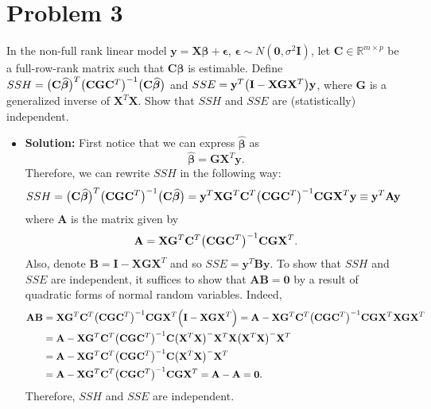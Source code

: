 \documentclass[11pt]{article}
\newcommand{\R}{{\mathbb R}}
\begin{document}
\section*{Problem 3}
In the non-full rank linear model $\mathbf{y} = \mathbf{X}\bm\beta + \bm\epsilon$, $\bm\epsilon\sim N(\mathbf{0},\sigma^2\mathbf{I})$, let $\mathbf{C}\in\R^{m\times p}$ be a full-row-rank matrix such that $\mathbf{C}\bm\beta$ is estimable.  Define $SSH = \big{(}\mathbf{C}\widehat{\bm\beta}\big{)}^T\big{(}\mathbf{C}\mathbf{G}\mathbf{C}^T\big{)}^{-1}\big{(}\mathbf{C}\widehat{\bm\beta}\big{)}$ and $SSE = \mathbf{y}^T\big{(}\mathbf{I} - \mathbf{X}\mathbf{G}\mathbf{X}^T\big{)}\mathbf{y}$, where $\mathbf{G}$ is a generalized inverse of $\mathbf{X}^T\mathbf{X}$.  Show that $SSH$ and $SSE$ are (statistically) independent.
\begin{itemize}
\item[] \textbf{Solution:} First notice that we can express $\widehat{\bm\beta}$ as
\[
\widehat{\bm\beta} = \mathbf{G}\mathbf{X}^T\mathbf{y}.
\]
Therefore, we can rewrite $SSH$ in the following way:
\begin{align*}
SSH &= \big{(}\mathbf{C}\widehat{\bm\beta}\big{)}^T\big{(}\mathbf{C}\mathbf{G}\mathbf{C}^T\big{)}^{-1}\big{(}\mathbf{C}\widehat{\bm\beta}\big{)} = \mathbf{y}^T\mathbf{X}\mathbf{G}^T\mathbf{C}^T\big{(}\mathbf{C}\mathbf{G}\mathbf{C}^T\big{)}^{-1} \mathbf{C}\mathbf{G}\mathbf{X}^T\mathbf{y} \equiv \mathbf{y}^T\mathbf{A}\mathbf{y}
\end{align*}
where $\mathbf{A}$ is the matrix given by
\[
\mathbf{A} = \mathbf{X}\mathbf{G}^T\mathbf{C}^T\big{(}\mathbf{C}\mathbf{G}\mathbf{C}^T\big{)}^{-1} \mathbf{C}\mathbf{G}\mathbf{X}^T.
\]
Also, denote $\mathbf{B} = \mathbf{I} - \mathbf{X}\mathbf{G}\mathbf{X}^T$ and so $SSE = \mathbf{y}^T\mathbf{B}\mathbf{y}$.  To show that $SSH$ and $SSE$ are independent, it suffices to show that $\mathbf{A}\mathbf{B} = \mathbf{0}$ by a result of quadratic forms of normal random variables.  Indeed,
\begin{align*}
\mathbf{A}\mathbf{B} &= \mathbf{X}\mathbf{G}^T\mathbf{C}^T\big{(}\mathbf{C}\mathbf{G}\mathbf{C}^T\big{)}^{-1} \mathbf{C}\mathbf{G}\mathbf{X}^T \Big{(}\mathbf{I} - \mathbf{X}\mathbf{G}\mathbf{X}^T\Big{)} = \mathbf{A} - \mathbf{X}\mathbf{G}^T\mathbf{C}^T\big{(}\mathbf{C}\mathbf{G}\mathbf{C}^T\big{)}^{-1} \mathbf{C}\mathbf{G}\mathbf{X}^T\mathbf{X}\mathbf{G}\mathbf{X}^T \\
&= \mathbf{A} - \mathbf{X}\mathbf{G}^T\mathbf{C}^T\big{(}\mathbf{C}\mathbf{G}\mathbf{C}^T\big{)}^{-1} \mathbf{C}\big{(}\mathbf{X}^T\mathbf{X}\big{)}^{-} \mathbf{X}^T\mathbf{X}\big{(}\mathbf{X}^T\mathbf{X}\big{)}^{-}\mathbf{X}^T \\
&= \mathbf{A} - \mathbf{X}\mathbf{G}^T\mathbf{C}^T\big{(}\mathbf{C}\mathbf{G}\mathbf{C}^T\big{)}^{-1} \mathbf{C}\big{(}\mathbf{X}^T\mathbf{X}\big{)}^{-} \mathbf{X}^T \\
&= \mathbf{A} - \mathbf{X}\mathbf{G}^T\mathbf{C}^T\big{(}\mathbf{C}\mathbf{G}\mathbf{C}^T\big{)}^{-1} \mathbf{C}\mathbf{G} \mathbf{X}^T = \mathbf{A} - \mathbf{A} = \mathbf{0}.
\end{align*}
Therefore, $SSH$ and $SSE$ are independent.
\end{itemize}
\end{document}
